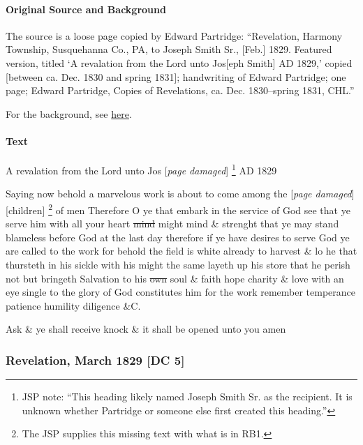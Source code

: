 			\paragraph{Original Source and Background}
			
				The source is a loose page copied by Edward Partridge: ``Revelation, Harmony Township, Susquehanna Co., PA, to Joseph Smith Sr., [Feb.] 1829. Featured version, titled `A revalation from the Lord unto Jos[eph Smith] AD 1829,' copied [between ca. Dec. 1830 and spring 1831]; handwriting of Edward Partridge; one page; Edward Partridge, Copies of Revelations, ca. Dec. 1830--spring 1831, CHL.''
				
				For the background, see \hyperref[DC4-HB]{here}.
			
			\paragraph{Text}
			
				A revalation from the Lord unto Jos [\textit{page damaged}]%
				\footnote{%
					JSP note: ``This heading likely named Joseph Smith Sr. as the recipient. It is unknown whether Partridge or someone else first created this heading.''
					}
				AD 1829
				
				Saying now behold a marvelous work is about to come among the [\textit{page damaged}] [children]%
					\footnote{%
						The JSP supplies this missing text with what is in RB1.
						}
				of men Therefore O ye that embark in the service of God see that ye serve him with all your heart \sout{mind} might mind \& strenght that ye may stand blameless before God at the last day therefore if ye have desires to serve God ye are called to the work for behold the field is white already to harvest \& lo he that thursteth in his sickle with his might the same layeth up his store that he perish not but bringeth Salvation to his \sout{own} soul \& faith hope charity \& love with an eye single to the glory of God constitutes him for the work remember temperance patience humility diligence \&C.
				
				Ask \& ye shall receive knock \& it shall be opened unto you amen
			
		\subsubsection{Revelation, March 1829 [DC 5]}
			\label{EMS-1828-1829-JS-MAR-1829}
			
